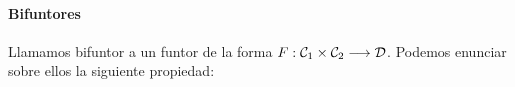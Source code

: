 \paragraph{Bifuntores}
Llamamos bifuntor a un funtor de
la forma $F : \mathcal{C}_1\times\mathcal{C}_2\longrightarrow \mathcal{D}$. Podemos enunciar sobre ellos
la siguiente propiedad:

\begin{proposition*}

\end{proposition*}






